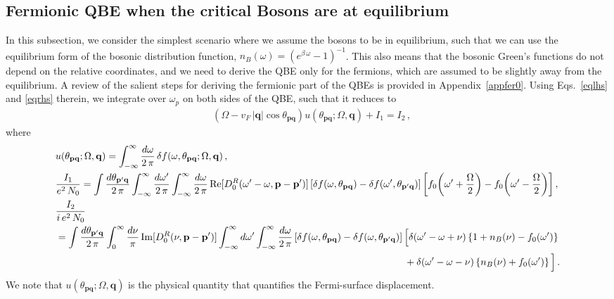 \documentclass[aps, prb, onecolumn, nofootinbib, citeautoscript, 10pt]{revtex4-2}
\def \nn{\nonumber \\}
\newcommand{\bp}{\mathbf{p}}
\newcommand{\bq}{\mathbf{q}}
\begin{document}
\subsection{Fermionic QBE when the critical Bosons are at equilibrium}
\label{sec-eqm-bos}

In this subsection, we consider the simplest scenario where we assume the bosons to be in equilibrium, such that
we can use the equilibrium form of the bosonic distribution function, $n_B (\omega) = ( e^{\beta \, \omega} - 1 )^{-1}  $. This also means that the bosonic Green’s functions do not depend on the relative coordinates, and we need to derive the QBE only for the fermions, which are assumed to be slightly away from the equilibrium. A review of the salient steps for deriving the fermionic part of the QBEs is provided in Appendix~\ref{appfer0}. Using Eqs.~\eqref{eqlhs} and \eqref{eqrhs} therein, we 
integrate over $ \omega_p $ on both sides of the QBE, such that it reduces to
\begin{align}
\label{final_eq}
& \left (  \Omega - v_F \,|\mathbf q| \cos{\theta_{\bp  \bq}}\right ) 
u(\theta_{\bp \bq};  \Omega, \bq )  +  I_1 = I_2\,,
\end{align} 
where
\begin{align}
& u( \theta_{\bp \bq};  \Omega, \bq )=
\int_{-\infty}^{\infty} \frac{d\omega }{ 2\, \pi  } 
\,  \delta f( \omega , \theta_{ \bp \bq};   \Omega, \bq )\,,\nn
& \frac{ I_1 } {e^2 \, N_0 } = 
\int \frac{d\theta_{\bp'\bq}}{ 2 \, \pi } \int_{-\infty}^{\infty}
\frac{d\omega'}{ 2 \, \pi } \int_{-\infty}^{\infty}
\frac{d\omega}{ 2 \, \pi } \, \text{Re} 
[ D^R_0 (\omega'-\omega, \bp-\bp') ]
\left [ \delta f( \omega, \theta_{\bp \bq})- \delta f(\omega', \theta_{\bp' \bq})\right] 
\left[ f_0 \bigg (\omega'  +  \frac{\Omega}{2} \bigg )
- f_0 \bigg (\omega'-\frac{\Omega}{2} \bigg )\right] ,\nn
& \frac{I_2} {  i \,e^2 \,N_0 }
\nn & =  \int \frac{d\theta_{\bp'\bq}}{ 2 \, \pi }
\int_0^\infty \frac{d\nu}{\pi} \,
\text{Im} [D_0^R( \nu, \bp-\bp')] \int_{-\infty}^\infty d\omega' 
\int_{-\infty}^\infty \frac{d\omega}{ 2 \, \pi } 
\left[ \delta f( \omega, \theta_{\bp\bq})-\delta f( \omega, \theta_{\bp'\bq})\right]
\Big[ \delta(\omega'-\omega  +  \nu) \left \lbrace 1 + n_B(\nu)-f_0(\omega') \right \rbrace
\nn  &  \hspace{ 12.5 cm } 
+  \delta(\omega'-\omega-\nu) 
\left \lbrace n_B(\nu) +  f_0(\omega') \right \rbrace  \Big ] \,.
\end{align}
We note that $u(\theta_{\bp \bq};  \Omega, \bq )$ is the physical quantity that quantifies the Fermi-surface displacement.
\end{document}

